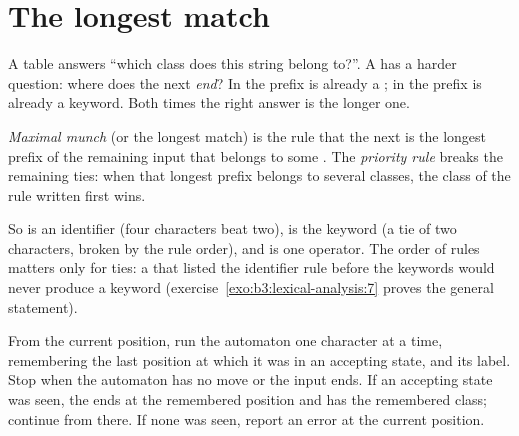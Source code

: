 
\section{The longest match}\label{sec:b3:lexical-analysis:munch}

A table answers ``which class does this string belong to?''. A  has a harder question: where does the next  \emph{end}? In \code{<=} the prefix \code{<} is already a ; in  the prefix  is already a keyword. Both times the right answer is the longer one.

\begin{definition}\label{def:b3:lexical-analysis:munch}
\emph{Maximal munch} (or the longest match) is the rule that the next  is the longest prefix of the remaining input that belongs to some . The \emph{priority rule} breaks the remaining ties: when that longest prefix belongs to several classes, the class of the rule written first wins.
\end{definition}

So  is an identifier (four characters beat two),  is the keyword (a tie of two characters, broken by the rule order), and \code{<=} is one operator. The order of rules matters only for ties: a  that listed the identifier rule before the keywords would never produce a keyword (exercise~\ref{exo:b3:lexical-analysis:7} proves the general statement).

\begin{method}\label{met:b3:lexical-analysis:munch}
From the current position, run the automaton one character at a time, remembering the last position at which it was in an accepting state, and its label. Stop when the automaton has no move or the input ends. If an accepting state was seen, the  ends at the remembered position and has the remembered class; continue from there. If none was seen, report an error at the current position.
\end{method}

